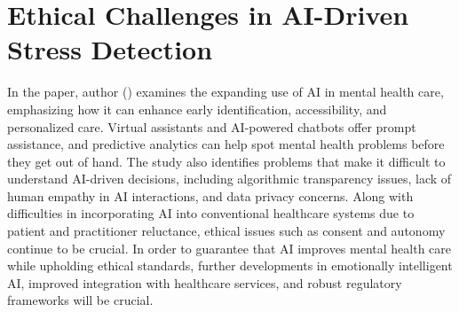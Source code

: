 \documentclass[Arial,12pt,openright,twoside]{book}
\begin{document}
  \section{Ethical Challenges in AI-Driven Stress Detection}
  In the paper, author (\citet{sriramprakash2017}) examines the expanding use of AI in mental health care, emphasizing how it can enhance early identification, accessibility, and personalized care. Virtual assistants and AI-powered chatbots offer prompt assistance, and predictive analytics can help spot mental health problems before they get out of hand. The study also identifies problems that make it difficult to understand AI-driven decisions, including algorithmic transparency issues, lack of human empathy in AI interactions, and data privacy concerns. Along with difficulties in incorporating AI into conventional healthcare systems due to patient and practitioner reluctance, ethical issues such as consent and autonomy continue to be crucial. In order to guarantee that AI improves mental health care while upholding ethical standards, further developments in emotionally intelligent AI, improved integration with healthcare services, and robust regulatory frameworks will be crucial.
  \vspace{-5mm} %
\end{document}
